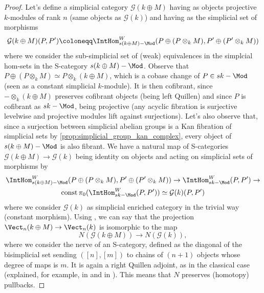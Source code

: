 \begin{proof}
                Let's define a simplicial category $\mathcal{G}(k \oplus M)$ having as objects projective $k$-modules of rank $n$ (same objects as $\mathcal{G}(k)$) and having as the simplicial set of morphisms \[\mathcal{G}(k \oplus M)(P, P') \coloneqq \IntHom^{W}_{s(k \oplus M)-\Mod}(P \oplus (P \otimes_k M), P' \oplus (P' \otimes_k M)) \] where we consider the sub-simplicial set of (weak) equivalences in the simplcial hom-sets in the S-category $s(k \oplus M)-\Mod$. Observe that $P \oplus (P \otimes_k M) \simeq P \otimes_k (k \oplus M)$, which is a cobase change of $P \in sk-\Mod$ (seen as a constant simplicial $k$-module). It is then cofibrant, since $- \otimes_k (k \oplus M)$ preserves cofibrant objects (being left Quillen) and since $P$ is cofibrant as $sk-\Mod$, being projective (any acyclic fibration is surjective levelwise and projective modules lift against surjections). Let's also observe that, since a surjection between simplicial abelian groups is a Kan fibration of simplicial sets by \cref{prop:simplicial_group_kan_complex}, every object of $s(k \oplus M)-\Mod$ is also fibrant. 
                We have a natural map of S-categories $\mathcal{G}(k \oplus M) \to \mathcal{G}(k)$ being identity on objects and acting on simplicial sets of morphisms by 
                \begin{gather*}
                    \IntHom^W_{s(k \oplus M)-\Mod}(P \oplus (P \otimes_k M), P' \oplus (P' \otimes_k M)) \to \IntHom^W_{sk-\Mod}(P, P') \to \\ \mathrm{const}\,\pi_0(\IntHom^W_{sk-\Mod}(P, P')) \simeq \mathcal{G}(k)(P, P')
                \end{gather*}
                where we consider $\mathcal{G}(k)$ as simplicial enriched category in the trivial way (constant morphism). 
                Using \cite[Prop.~A.0.6]{ToVe:hag2}, we can say that the projection $\Vect_n(k \oplus M) \to \Vect_n(k)$ is isomorphic to the map \[N(\mathcal{G}(k \oplus M)) \to N(\mathcal{G}(k)),\] where we consider the nerve of an S-category, defined as the diagonal of the bisimplicial set sending $([n], [m])$ to chains of $(n+1)$ objects whose degree of maps is $m$. It is again a right Quillen adjoint, as in the classical case (explained, for example, in \cite{dwykan:simpl_loc} and in \cite[Appendix~A]{ToVe:hag2}). This means that $N$ preserves (homotopy) pullbacks.
                

\end{proof}
